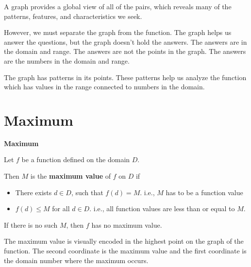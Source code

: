 \documentclass{ximera}
\begin{document}
A graph provides a global view of all of the pairs, which reveals many of the patterns, features, and characteristics we seek.   

However, we must separate the graph from the function.  The graph helps us answer the questions, but the graph doesn't hold the answers.  The answers are in the domain and range.  The answers are not the points in the graph.  The answers are the numbers in the domain and range.


The graph has patterns in its points.  These patterns help us analyze the function which has values in the range connected to numbers in the domain.




\section{Maximum}



\begin{definition} \textbf{\textcolor{green!50!black}{Maximum}} 


Let $f$ be a function defined on the domain $D$.

Then $M$ is the \textbf{maximum value} of $f$ on $D$ if    


\begin{itemize}
\item There exists $d \in D$, such that $f(d) = M$.   i.e., $M$ has to be a function value \\

\item $f(d) \leq M$ for all $d \in D$. i.e., all function values are less than or equal to $M$. 

\end{itemize}


If there is no such $M$, then $f$ has no maximum value.

\end{definition}



\begin{observation}
The maximum value is visually encoded in the highest point on the graph of the function.  The second coordinate is the maximum value and the first coordinate is the domain number where the maximum occurs.
\end{observation}
\end{document}
